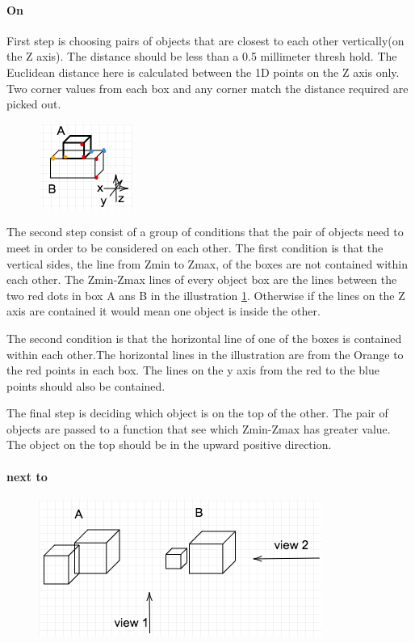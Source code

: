 \paragraph{On}



First step is choosing pairs of objects that are closest to each other vertically(on the Z axis). The distance should be less than a 0.5 millimeter thresh hold. The Euclidean distance here is calculated between the 1D points on the Z axis only. Two corner values from each box and any corner match the distance required are picked out. 

\begin{figure}[H]
\includegraphics[scale=0.7]{images/on.png}
\caption{}
\label{fig:on}
\end{figure}


The second step consist of a group of conditions that the pair of objects need to meet in order to be considered on each other. The first condition is that the vertical sides, the line from Zmin to Zmax, of the boxes are not contained within each other. The Zmin-Zmax lines of every object box are the lines between the two red dots in box A ans B in the illustration \ref{fig:on}. Otherwise if the lines on the Z axis are contained it would mean one object is inside the other. 

The second condition is that the horizontal line of one of the boxes is contained within each other.The horizontal lines in the illustration are from the Orange to the red points in each box. The lines on the y axis from the red to the blue points should also be contained. 

The final step is deciding which object is on the top of the other. The pair of objects are passed to a function that see which Zmin-Zmax has greater value. The object on the top should be in the upward positive direction. 


\paragraph{next to}


\begin{figure}[H]
\centering
\includegraphics[scale=0.5]{images/Nextview.png}
\caption{}
\label{fig:next}
\end{figure}


